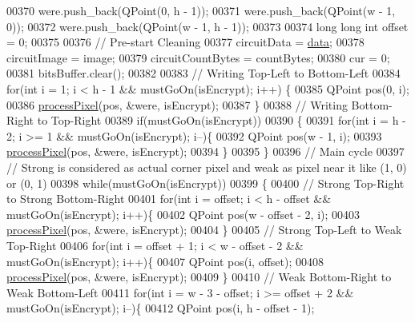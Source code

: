 \begin{DoxyCode}
00370     were.push\_back(QPoint(0, h - 1));
00371     were.push\_back(QPoint(w - 1, 0));
00372     were.push\_back(QPoint(w - 1, h - 1));
00373 
00374     \textcolor{keywordtype}{long} \textcolor{keywordtype}{long} \textcolor{keywordtype}{int} offset = 0;
00375 
00376     \textcolor{comment}{// Pre-start Cleaning}
00377     circuitData = \hyperlink{namespace_errors_dict_setup_af570460846fb9f0c91abd308a095dcdc}{data};
00378     circuitImage = image;
00379     circuitCountBytes = countBytes;
00380     cur = 0;
00381     bitsBuffer.clear();
00382 
00383     \textcolor{comment}{// Writing Top-Left to Bottom-Left}
00384     \textcolor{keywordflow}{for}(\textcolor{keywordtype}{int} i = 1; i < h - 1 && mustGoOn(isEncrypt); i++) \{
00385         QPoint pos(0, i);
00386         \hyperlink{class_model_p_c_a1171f9fe1550133dc9053a46b4e5bcfd}{processPixel}(pos, &were, isEncrypt);
00387     \}
00388     \textcolor{comment}{// Writing Bottom-Right to Top-Right}
00389     \textcolor{keywordflow}{if}(mustGoOn(isEncrypt))
00390     \{
00391         \textcolor{keywordflow}{for}(\textcolor{keywordtype}{int} i = h - 2; i >= 1 && mustGoOn(isEncrypt); i--)\{
00392             QPoint pos(w - 1, i);
00393             \hyperlink{class_model_p_c_a1171f9fe1550133dc9053a46b4e5bcfd}{processPixel}(pos, &were, isEncrypt);
00394         \}
00395     \}
00396     \textcolor{comment}{// Main cycle}
00397     \textcolor{comment}{// Strong is considered as actual corner pixel and weak as pixel near it like (1, 0) or (0, 1)}
00398     \textcolor{keywordflow}{while}(mustGoOn(isEncrypt))
00399     \{
00400         \textcolor{comment}{// Strong Top-Right to Strong Bottom-Right}
00401         \textcolor{keywordflow}{for}(\textcolor{keywordtype}{int} i = offset; i < h - offset && mustGoOn(isEncrypt); i++)\{
00402             QPoint pos(w - offset - 2, i);
00403             \hyperlink{class_model_p_c_a1171f9fe1550133dc9053a46b4e5bcfd}{processPixel}(pos, &were, isEncrypt);
00404         \}
00405         \textcolor{comment}{// Strong Top-Left to Weak Top-Right}
00406         \textcolor{keywordflow}{for}(\textcolor{keywordtype}{int} i = offset + 1; i < w - offset - 2 && mustGoOn(isEncrypt); i++)\{
00407             QPoint pos(i, offset);
00408             \hyperlink{class_model_p_c_a1171f9fe1550133dc9053a46b4e5bcfd}{processPixel}(pos, &were, isEncrypt);
00409         \}
00410         \textcolor{comment}{// Weak Bottom-Right to Weak Bottom-Left}
00411         \textcolor{keywordflow}{for}(\textcolor{keywordtype}{int} i = w - 3 - offset; i >= offset + 2 && mustGoOn(isEncrypt); i--)\{
00412             QPoint pos(i, h - offset - 1);

\end{DoxyCode}
